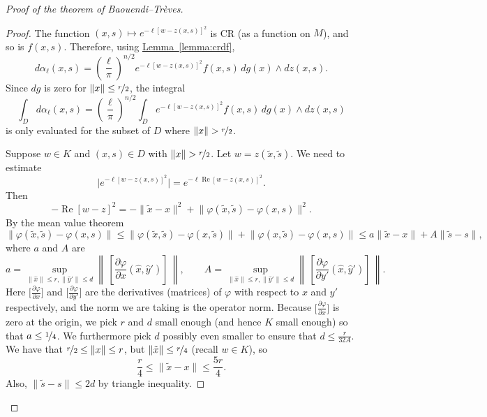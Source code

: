 \documentclass[12pt,openany]{book}
\renewcommand{\Re}{\operatorname{Re}}
\newcommand{\snorm}[1]{\lVert {#1} \rVert}
\newcommand{\babs}[1]{\bigl\lvert {#1} \bigr\rvert}
\newcommand{\norm}[1]{\left\lVert {#1} \right\rVert}
\theoremstyle{plain}
\theoremstyle{remark}
\theoremstyle{definition}
\theoremstyle{exercise}
\theoremstyle{example}
\newcommand{\lemmaref}[1]{\hyperref[#1]{Lemma~\ref*{#1}}}
\begin{document}
\begin{proof}[Proof of the theorem of Baouendi--Tr{\`e}ves]
\begin{proof}
The function
$(x,s) \mapsto e^{-\ell [w - z(x,s)]^2}$ is CR (as a function on $M$), and so
is $f(x,s)$.  Therefore, using \lemmaref{lemma:crdf},
\begin{equation*}
d \alpha_{\ell}(x,s)
=
{\left(\frac{\ell}{\pi}\right)}^{n/2}
e^{-\ell [w - z(x,s)]^2 } f(x,s)
\,
dg(x)
\wedge
dz(x,s) .
\end{equation*}
Since $dg$ is zero for $\snorm{x} \leq \nicefrac{r}{2}$, the integral
\begin{equation*}
\int_D
d \alpha_\ell(x,s)
=
{\left(\frac{\ell}{\pi}\right)}^{n/2}
\int_D
e^{ -\ell [w - z(x,s)]^2} f(x,s)
\,
dg(x)
\wedge
dz(x,s)
\end{equation*}
is only evaluated for the subset of $D$ where $\snorm{x} > \nicefrac{r}{2}$.

Suppose $w \in K$ and $(x,s) \in D$ with $\snorm{x} > \nicefrac{r}{2}$.
Let $w = z(\tilde{x},\tilde{s})$.
We need to estimate
\begin{equation*}
\babs{e^{ -\ell {[w - z(x,s)]}^2 }} =
e^{ -\ell \Re {[w - z(x,s)]}^2 } .
\end{equation*}
Then
\begin{equation*}
-\Re {[w - z]}^2 =
-\snorm{\tilde{x}-x}^2
+
\snorm{\varphi(\tilde{x},\tilde{s})-\varphi(x,s)}^2 .
\end{equation*}
By the mean value theorem
\begin{equation*}
\snorm{\varphi(\tilde{x},\tilde{s})-\varphi(x,s)}
\leq
\snorm{\varphi(\tilde{x},\tilde{s})-\varphi(x,\tilde{s})}
+
\snorm{\varphi(x,\tilde{s})-\varphi(x,s)}
\leq
a \snorm{\tilde{x}-x}
+
A \snorm{\tilde{s}-s} ,
\end{equation*}
where $a$ and $A$ are
\begin{equation*}
a = \sup_{\snorm{\hat{x}} \leq r, \snorm{\hat{y}'} \leq d}
\norm{\,\left[\frac{\partial \varphi}{\partial x}(\hat{x},\hat{y}')\right]\,},
\qquad
A = \sup_{\snorm{\hat{x}} \leq r, \snorm{\hat{y}'} \leq d}
\norm{\,\left[\frac{\partial \varphi}{\partial y'}(\hat{x},\hat{y}')\right]\,}.
\end{equation*}
Here $\bigl[ \frac{\partial \varphi}{\partial x} \bigr]$ and
$\bigl[ \frac{\partial \varphi}{\partial y'} \bigr]$ are
the derivatives (matrices) of $\varphi$ with respect to $x$ and $y'$
respectively, and the norm we are taking is the operator norm.
Because $\bigl[ \frac{\partial \varphi}{\partial x} \bigr]$ is zero
at the origin, we pick $r$ and $d$ small
enough (and hence $K$ small enough) so that $a \leq \nicefrac{1}{4}$.
We furthermore pick $d$ possibly even smaller to ensure
that $d \leq \frac{r}{32A}$.  We have that $\nicefrac{r}{2} \leq \snorm{x} \leq
r$, but $\snorm{\tilde{x}} \leq \nicefrac{r}{4}$ (recall $w \in K$), so
\begin{equation*}
\frac{r}{4} \leq \snorm{\tilde{x}-x} \leq \frac{5r}{4} .
\end{equation*}
Also, $\snorm{\tilde{s}-s} \leq 2d$ by triangle inequality.


\end{proof}
\end{proof}
\end{document}
